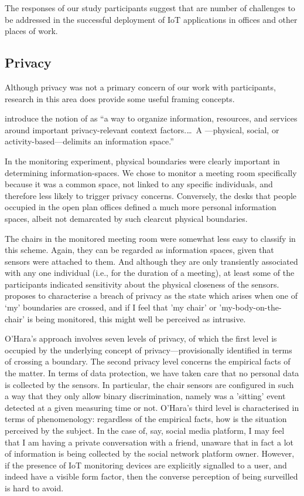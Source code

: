 The responses of our study participants
suggest that are number of challenges to be addressed in
the successful deployment of IoT applications in offices and other
places of work.

\subsection{Privacy}
\label{subsec:privacy}

Although privacy was not a primary concern of our work with
participants, research in this area does provide some useful framing
concepts.

\cite{Jiang-2002-MPCI} introduce the notion of  as ``a way to organize information, resources, and services
  around important privacy-relevant context factors.\ldots\  A
  ---physical, social, or activity-based---delimits an
  information space.''

In the monitoring experiment, physical boundaries were clearly
important in determining information-spaces. We chose to monitor a meeting room
specifically because it was a common space, not linked to any specific
individuals, and therefore less likely to trigger privacy
concerns. Conversely, the desks that people occupied in the open plan
offices defined a much more personal information spaces, albeit not
demarcated by such clearcut physical boundaries. 

The chairs in the monitored meeting room were somewhat less easy to
classify in this scheme. Again, they can be regarded as information
spaces, given that sensors were attached to them. And although they
are only transiently associated with any one individual (i.e., for the
duration of a meeting), at least some of the participants indicated
sensitivity about the physical closeness of the
sensors. \cite{Ohara-2016-TSVP} proposes to characterise a breach of privacy as
the state which arises when one of `my' boundaries are crossed, and if
I feel that 'my chair' or 'my-body-on-the-chair' is being monitored,
this might well be perceived as intrusive. 

O'Hara's \cite{Ohara-2016-TSVP}  approach involves seven levels of
privacy, of which the first level is occupied by the underlying concept of privacy---provisionally
identified in terms of crossing a boundary. The second privacy level concerns
the empirical facts of the matter. In terms of data protection, we
have taken care that no personal data is collected by the sensors. In
particular, the chair sensors are configured in such a way that they only allow binary
discrimination, namely was a 'sitting' event detected at a given
measuring time or not. O'Hara's third level is characterised in terms
of phenomenology: regardless of the empirical facts, how is the
situation perceived by the subject. In the case of, say, social media
platform, I may feel that I am having a private conversation with a
friend, unaware that in fact a lot of information is being collected
by the social network platform owner. However, if the presence of IoT monitoring
devices are explicitly signalled to a user, and indeed have a visible
form factor, then the converse perception of being surveilled is hard
to avoid.

